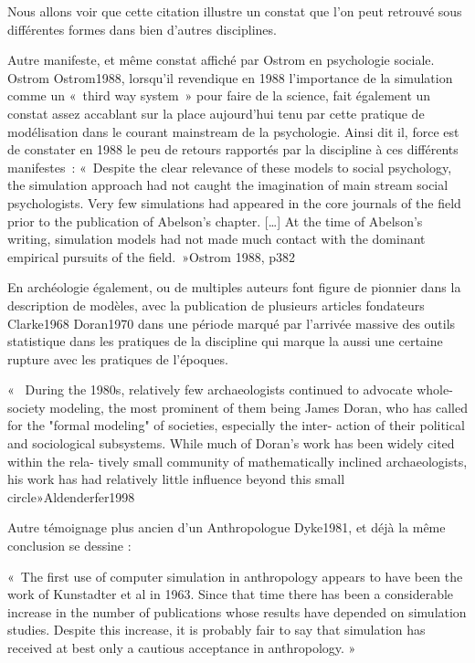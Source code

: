 Nous allons voir que cette citation illustre un constat que l'on peut retrouvé sous différentes formes dans bien d'autres disciplines.

Autre manifeste, et même constat affiché par Ostrom en psychologie sociale. Ostrom {Ostrom1988}, lorsqu'il revendique en 1988 l'importance de la simulation comme un « third way system » pour faire de la science,  fait également un constat assez accablant sur la place aujourd'hui tenu par cette pratique de modélisation dans le courant mainstream de la psychologie. Ainsi dit il,  force est de constater en 1988 le peu de retours rapportés par la discipline à ces différents manifestes : « Despite the clear relevance of these models to  social psychology, the simulation approach had not  caught the imagination of main stream social psychologists. Very few simulations had appeared in the core journals of the field prior to the publication of Abelson's chapter. […] At the time of Abelson's writing, simulation models had not made much contact with the dominant empirical pursuits of the field. »{Ostrom 1988, p382}

En archéologie également, ou de multiples auteurs font figure de pionnier dans la description de modèles, avec la publication de plusieurs articles fondateurs {Clarke1968} {Doran1970} dans une période marqué par l'arrivée massive des outils statistique dans les pratiques de la discipline qui marque la aussi une certaine rupture avec les pratiques de l'époques.

«  During the 1980s, relatively few archaeologists continued to advocate whole-society modeling, the most prominent of them being James Doran, who has called for the "formal modeling" of societies, especially the inter- action of their political and sociological subsystems. While much of Doran's work has been widely cited within the rela- tively small community of mathematically inclined archaeologists, his work has had relatively little influence beyond this small circle»{Aldenderfer1998}


Autre témoignage plus ancien d'un Anthropologue {Dyke1981}, et déjà la même conclusion se dessine : 

« The first use of computer simulation in anthropology appears to have been the work of Kunstadter et al in 1963. Since that time there has been a considerable increase in the number of publications whose results have depended on simulation studies. Despite this increase, it is probably fair to say that simulation has received at best only a cautious acceptance in anthropology. »

